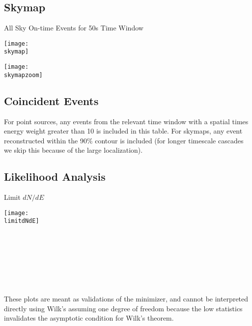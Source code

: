 \documentclass[titlepage]{article}
\begin{document}
%
%
%
%
%
%
%

\pagebreak
\subsection{Skymap}

{
  \centering
  {\Large All Sky On-time Events for 50s Time Window}

  \texttt{[image: \\skymap]}

  \texttt{[image: \\skymapzoom]}

}
\pagebreak


\subsection{Coincident Events}
For point sources, any events from the relevant time window with a spatial times energy weight greater than 10 is included in this table. For skymaps, any event reconstructed within the 90\% contour is included (for longer timescale cascades we skip this because of the large localization).
\event

\subsection{Likelihood Analysis}
\results
\pagebreak

\backgroundpdfplot

\survivialfunctionplot

\pagebreak
{
  \centering

  {\Large Limit $dN/dE$}

  \texttt{[image: \\limitdNdE]}
  \\
  \\

  \tsd

  \\
  \\
  \upperlim

  \\
  \\
  \nsscan

  These plots are meant as validations of the minimizer, and cannot be interpreted directly using Wilk's assuming one degree of freedom because the low statistics invalidates the asymptotic condition for Wilk's theorem.
}
\end{document}
